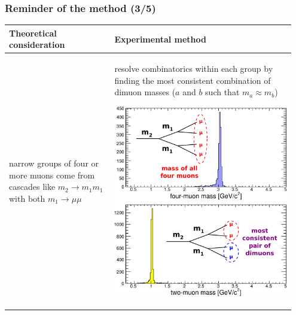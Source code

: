 \documentclass[compress]{beamer}
\begin{document}
\begin{frame}
\frametitle{Reminder of the method (3/5)}

\renewcommand{\arraystretch}{1.7}
\begin{tabular}{p{0.35\linewidth} | p{0.6\linewidth}}
Theoretical consideration & Experimental method \\\hline

narrow groups of four or more muons come from cascades like $m_2 \to m_1 m_1$ with both $m_1 \to \mu\mu$ & resolve combinatorics within each group by finding the most consistent combination of dimuon masses ($a$ and $b$ such that $m_a \approx m_b$)

\vspace{0.3 cm}
\centering \includegraphics[width=0.8\linewidth]{four-two-muon-mass.pdf}

\vspace{-0.75 cm}
\end{tabular}
\end{frame}
\end{document}
